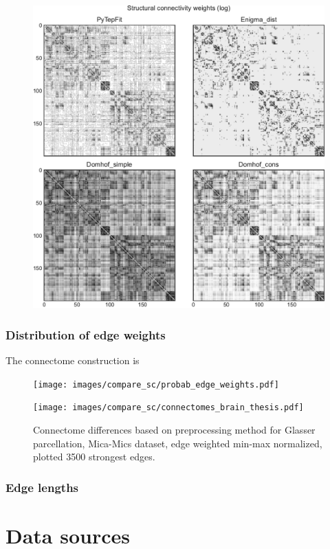 \begin{figure}[h!]
  \begin{center}
    \includegraphics[width=\textwidth]{images/compare_sc/sc_matrices_thesis.pdf}
  \end{center}
  \caption[\TODO]{\TODO}
  \label{fig:sc_matrices}
\end{figure}

\subsubsection{Distribution of edge weights}

The connectome construction is 

\begin{figure}
  \begin{center}
    \texttt{[image: images/compare\_sc/probab\_edge\_weights.pdf]}
  \end{center}
  \caption[\TODO]{\TODO}
  \label{fig:edge_weights}
\end{figure}


\begin{figure}
  \begin{center}
    \texttt{[image: images/compare\_sc/connectomes\_brain\_thesis.pdf]}
  \end{center}
  \caption[Connectome differences based on preprocessing method]{Connectome differences based on preprocessing method for Glasser parcellation, Mica-Mics dataset, edge weighted min-max normalized, plotted 3500 strongest edges.}
  \label{fig:edge_weights}
\end{figure}

\subsubsection{Edge lengths}


\section{Data sources}

